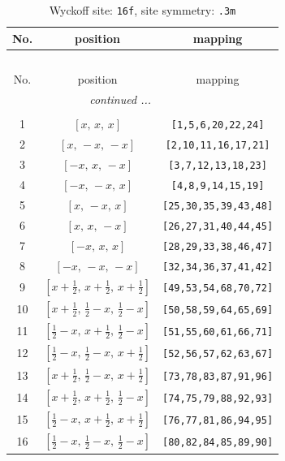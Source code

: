 \documentclass[fleqn,8pt]{jsarticle}
\begin{document}
\begin{longtable}{ccc}
\caption{Wyckoff site: {\tt 16f}, site symmetry: {\tt .3m}}
 \\
 \hline \hline
No. & position & mapping \\ \hline \endfirsthead

\multicolumn{2}{l}{\tablename\ \thetable{}} \\
 \hline \hline
No. & position & mapping \\ \hline \endhead

 \hline \hline
\multicolumn{2}{r}{\footnotesize\it continued ...} \\ \endfoot

 \hline \hline
\multicolumn{2}{r}{} \\ \endlastfoot

1 & $\left[ x,\, x,\, x \right]$ & {\tt [1,5,6,20,22,24]} \\ \hline
2 & $\left[ x,\, - x,\, - x \right]$ & {\tt [2,10,11,16,17,21]} \\ \hline
3 & $\left[ - x,\, x,\, - x \right]$ & {\tt [3,7,12,13,18,23]} \\ \hline
4 & $\left[ - x,\, - x,\, x \right]$ & {\tt [4,8,9,14,15,19]} \\ \hline
5 & $\left[ x,\, - x,\, x \right]$ & {\tt [25,30,35,39,43,48]} \\ \hline
6 & $\left[ x,\, x,\, - x \right]$ & {\tt [26,27,31,40,44,45]} \\ \hline
7 & $\left[ - x,\, x,\, x \right]$ & {\tt [28,29,33,38,46,47]} \\ \hline
8 & $\left[ - x,\, - x,\, - x \right]$ & {\tt [32,34,36,37,41,42]} \\ \hline
9 & $\left[ x + \frac{1}{2},\, x + \frac{1}{2},\, x + \frac{1}{2} \right]$ & {\tt [49,53,54,68,70,72]} \\ \hline
10 & $\left[ x + \frac{1}{2},\, \frac{1}{2} - x,\, \frac{1}{2} - x \right]$ & {\tt [50,58,59,64,65,69]} \\ \hline
11 & $\left[ \frac{1}{2} - x,\, x + \frac{1}{2},\, \frac{1}{2} - x \right]$ & {\tt [51,55,60,61,66,71]} \\ \hline
12 & $\left[ \frac{1}{2} - x,\, \frac{1}{2} - x,\, x + \frac{1}{2} \right]$ & {\tt [52,56,57,62,63,67]} \\ \hline
13 & $\left[ x + \frac{1}{2},\, \frac{1}{2} - x,\, x + \frac{1}{2} \right]$ & {\tt [73,78,83,87,91,96]} \\ \hline
14 & $\left[ x + \frac{1}{2},\, x + \frac{1}{2},\, \frac{1}{2} - x \right]$ & {\tt [74,75,79,88,92,93]} \\ \hline
15 & $\left[ \frac{1}{2} - x,\, x + \frac{1}{2},\, x + \frac{1}{2} \right]$ & {\tt [76,77,81,86,94,95]} \\ \hline
16 & $\left[ \frac{1}{2} - x,\, \frac{1}{2} - x,\, \frac{1}{2} - x \right]$ & {\tt [80,82,84,85,89,90]} \\
\end{longtable}
\end{document}
